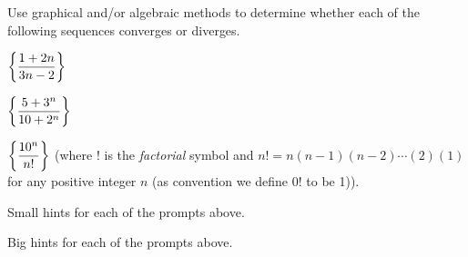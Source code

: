 \begin{activity} \label{7.1.Act3} Use graphical and/or algebraic methods to determine whether each of the following sequences converges or diverges.
\ba
\item $\displaystyle \left\{\frac{1+2n}{3n-2}\right\}$


\item $\displaystyle \left\{\frac{5+3^n}{10+2^n}\right\}$

\item $\displaystyle \left\{\frac{10^n}{n!}\right\}$ (where $!$ is the \emph{factorial} symbol and $n! = n(n-1)(n-2) \cdots (2)(1)$ for any positive integer $n$ (as convention we define $0!$ to be 1)).

\ea
\end{activity}

\begin{smallhint}
\ba
	\item Small hints for each of the prompts above.
\ea
\end{smallhint}
\begin{bighint}
\ba
	\item Big hints for each of the prompts above.
\ea
\end{bighint}
